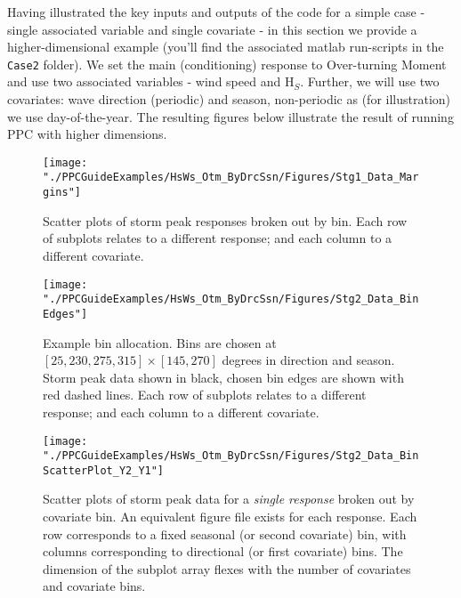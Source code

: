
Having illustrated the key inputs and outputs of the code for a simple case - single associated variable and single covariate - in this section we provide a higher-dimensional example (you'll find the associated matlab run-scripts in the \verb|Case2| folder). We set the main (conditioning) response to Over-turning Moment and use two associated variables - wind speed and H$_S$. Further, we will use two covariates: wave direction (periodic) and season, non-periodic as (for illustration) we use day-of-the-year. The resulting figures below illustrate the result of running PPC with higher dimensions. 

\begin{figure}
	\centering
	\texttt{[image: "./PPCGuideExamples/HsWs\_Otm\_ByDrcSsn/Figures/Stg1\_Data\_Margins"]}
	\caption{ Scatter plots of storm peak responses broken out by bin. Each row of subplots relates to a different response; and each column to a different covariate.}
	\label{fig:Ex_Stg2a}
\end{figure}

\begin{figure}
	\centering
	\texttt{[image: "./PPCGuideExamples/HsWs\_Otm\_ByDrcSsn/Figures/Stg2\_Data\_BinEdges"]}
	\caption{Example bin allocation. Bins are chosen at $[25,230,275,315]\times[145,270]$ degrees in direction and season. Storm peak data shown in black, chosen bin edges are shown with red dashed lines. Each row of subplots relates to a different response; and each column to a different covariate.}
	\label{fig:Ex_Stg2b}
\end{figure}
\begin{figure}
	\centering
	\texttt{[image: "./PPCGuideExamples/HsWs\_Otm\_ByDrcSsn/Figures/Stg2\_Data\_BinScatterPlot\_Y2\_Y1"]}
	\caption{Scatter plots of storm peak data for a \emph{single response} broken out by covariate bin. An equivalent figure file exists for each response. Each row corresponds to a fixed seasonal (or second covariate) bin, with columns corresponding to directional (or first covariate) bins. The dimension of the subplot array flexes with the number of covariates and covariate bins. }
	\label{fig:Ex_Stg2c}
\end{figure}



